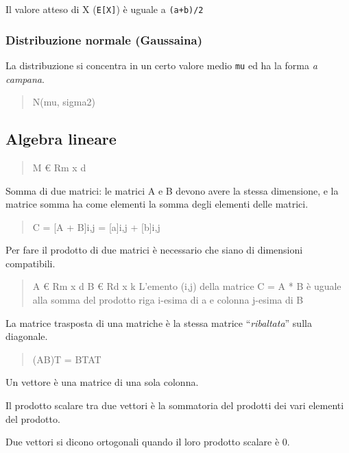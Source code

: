 Il valore atteso di X (\texttt{E{[}X{]}}) è uguale a \texttt{(a+b)/2}

\subsubsection{Distribuzione normale
(Gaussaina)}\label{distribuzione-normale-gaussaina}

La distribuzione si concentra in un certo valore medio \texttt{mu} ed ha
la forma \emph{a campana}.

\begin{quote}
N(mu, sigma2)

\end{quote}

\subsection{Algebra lineare}\label{algebra-lineare}

\begin{quote}
M \euro{} Rm x d
\end{quote}

Somma di due matrici: le matrici A e B devono avere la stessa
dimensione, e la matrice somma ha come elementi la somma degli elementi
delle matrici.

\begin{quote}
C = {[}A + B{]}i,j = {[}a{]}i,j + {[}b{]}i,j
\end{quote}

Per fare il prodotto di due matrici è necessario che siano di dimensioni
compatibili.

\begin{quote}
A \euro{} Rm x d B \euro{} Rd x k L'emento (i,j) della matrice C = A * B
è uguale alla somma del prodotto riga i-esima di a e colonna j-esima di
B
\end{quote}

La matrice trasposta di una matriche è la stessa matrice
``\emph{ribaltata}'' sulla diagonale.

\begin{quote}
(AB)T = BTAT
\end{quote}

Un vettore è una matrice di una sola colonna.

Il prodotto scalare tra due vettori è la sommatoria del prodotti dei
vari elementi del prodotto.

Due vettori si dicono ortogonali quando il loro prodotto scalare è 0.

